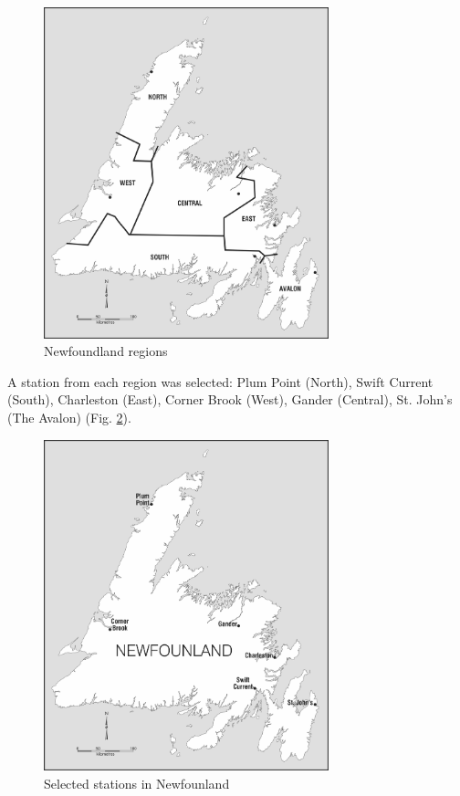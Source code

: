\documentclass{article}
\begin{document}
\begin{enumerate}
\begin{center}
\begin{figure}[H]
\centering
\includegraphics[width=3.25in]{../docs/Island_of_Newfoundland_Regions_final.jpg}
\caption{Newfoundland regions}
\label{regions}
\end{figure}
\end{center}

A station from each region was selected: Plum Point (North), Swift Current (South), Charleston (East), Corner Brook (West), Gander (Central), St. John's (The Avalon) (Fig. \ref{selected_stations}).
 
 \begin{center}
 \begin{figure}[H]
 \centering
 \includegraphics[width=3.25in]{../docs/Island_of_Newfoundland_final.jpg}
 \caption{Selected stations in Newfounland }
 \label{selected_stations}
 \end{figure}
 \end{center}


\end{enumerate}
\end{document}
